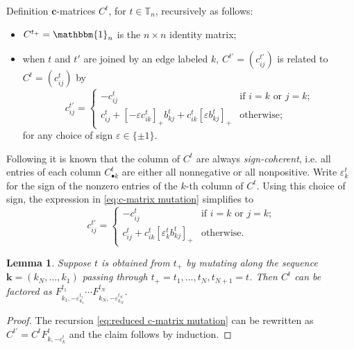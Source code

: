 \documentclass{amsart}
\newtheorem{lemma}[theorem]{Lemma}
\numberwithin{theorem}{section}
\newcommand{\bfc}{{\boldsymbol{c}}}
\newcommand{\bfk}{{\boldsymbol{k}}}
\newcommand{\TT}{\mathbb{T}}
\newcommand{\bOne}{\mathbbm{1}}
\begin{document}
  Definition $\bfc$-matrices $C^t$, for $t\in\TT_n$, recursively as follows:
  \begin{itemize}
    \item $C^{t_+} = \bOne_n$ is the $n\times n$ identity matrix;
    \item when $t$ and $t'$ are joined by an edge labeled $k$, $C^{t'}=(c^{t'}_{ij})$ is related to $C^t=(c^t_{ij})$ by
      \begin{equation}
        \label{eq:c-matrix mutation}
        c^{t'}_{ij} = \begin{cases} -c^t_{ij} & \text{if $i=k$ or $j=k$;}\\ c^t_{ij} + [-\varepsilon c^t_{ik}]_+ b^t_{kj} + c^t_{ik} [\varepsilon b^t_{kj}]_+ & \text{otherwise;} \end{cases}
      \end{equation}
      for any choice of sign $\varepsilon\in\{\pm1\}$.
  \end{itemize}

  Following \cite{keller,ghkk} it is known that the column of $C^t$ are always \emph{sign-coherent}, i.e. all entries of each column $C^t_{\bullet k}$ are either all nonnegative or all nonpositive.
  Write $\varepsilon^t_k$ for the sign of the nonzero entries of the $k$-th column of $C^t$.
  Using this choice of sign, the expression in \eqref{eq:c-matrix mutation} simplifies to
  \begin{equation}
    \label{eq:reduced c-matrix mutation}
    c^{t'}_{ij} = \begin{cases} -c^t_{ij} & \text{if $i=k$ or $j=k$;}\\ c^t_{ij} + c^t_{ik} [\varepsilon^t_k b^t_{kj}]_+ & \text{otherwise.} \end{cases}
  \end{equation}

  \begin{lemma}
    \label{le:c-matrix factorization}
    Suppose $t$ is obtained from $t_+$ by mutating along the sequence $\bfk=(k_N,\ldots,k_1)$ passing through $t_+=t_1,\ldots,t_N,t_{N+1}=t$.
    Then $C^t$ can be factored as $F^{t_1}_{k_1,-\varepsilon^{t_1}_{k_1}}\cdots F^{t_N}_{k_N,-\varepsilon^{t_N}_{k_N}}$.
  \end{lemma}
  \begin{proof}
    The recursion \eqref{eq:reduced c-matrix mutation} can be rewritten as $C^{t'}=C^t F^t_{k,-\varepsilon^t_k}$ and the claim follows by induction.
  \end{proof}
\end{document}
